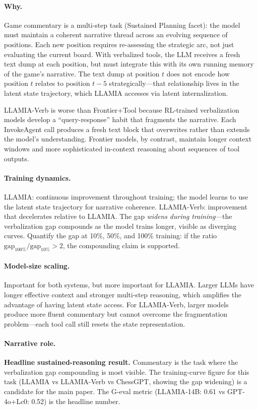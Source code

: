 \paragraph{Why.}
Game commentary is a multi-step task (Sustained Planning facet): the model
must maintain a coherent narrative thread across an evolving sequence
of positions. Each new position requires re-assessing the strategic
arc, not just evaluating the current board. With verbalized tools,
the LLM receives a fresh text dump at each position, but must
integrate this with its own running memory of the game's narrative.
The text dump at position $t$ does not encode how position $t$
relates to position $t{-}5$ strategically---that relationship lives
in the latent state trajectory, which LLAMIA accesses via latent
internalization.

LLAMIA-Verb is worse than Frontier+Tool because RL-trained
verbalization models develop a ``query-response'' habit that
fragments the narrative. Each InvokeAgent call produces a fresh text
block that overwrites rather than extends the model's understanding.
Frontier models, by contrast, maintain longer context windows and
more sophisticated in-context reasoning about sequences of tool
outputs.

\paragraph{Training dynamics.}
LLAMIA: continuous improvement throughout training; the model learns
to use the latent state trajectory for narrative coherence.
LLAMIA-Verb: improvement that decelerates relative to LLAMIA. The
gap \emph{widens during training}---the verbalization gap compounds
as the model trains longer, visible as diverging curves. Quantify
the gap at 10\%, 50\%, and 100\% training: if the ratio
$\text{gap}_{100\%} / \text{gap}_{10\%} > 2$, the compounding claim
is supported.

\paragraph{Model-size scaling.}
Important for both systems, but more important for LLAMIA. Larger
LLMs have longer effective context and stronger multi-step reasoning,
which amplifies the advantage of having latent state access. For
LLAMIA-Verb, larger models produce more fluent commentary but
cannot overcome the fragmentation problem---each tool call still
resets the state representation.

\paragraph{Narrative role.}
\textbf{Headline sustained-reasoning result.} Commentary is the task
where the verbalization gap compounding is most visible. The training-curve figure
for this task (LLAMIA vs LLAMIA-Verb vs ChessGPT, showing the gap
widening) is a candidate for the main paper. The G-eval metric
(LLAMIA-14B: 0.61 vs GPT-4o+Lc0: 0.52) is the headline number.

